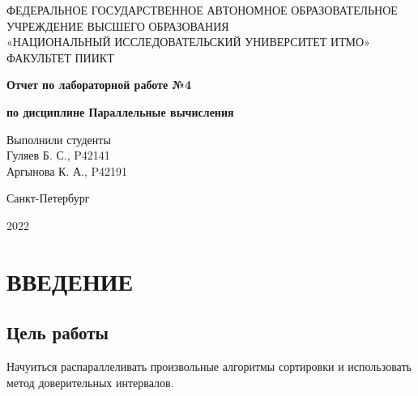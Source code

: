 \documentclass[14pt, a4paper, oneside, final]{extarticle}
\begin{document}
 
\setcounter{page}{0}
\begin{center} 
\small
\footnotesize{ФЕДЕРАЛЬНОЕ ГОСУДАРСТВЕННОЕ АВТОНОМНОЕ ОБРАЗОВАТЕЛЬНОЕ}\\
\footnotesize{УЧРЕЖДЕНИЕ ВЫСШЕГО ОБРАЗОВАНИЯ}\\ 
\footnotesize{«НАЦИОНАЛЬНЫЙ ИССЛЕДОВАТЕЛЬСКИЙ УНИВЕРСИТЕТ ИТМО»}\\
\hfill \break 
\footnotesize{ФАКУЛЬТЕТ ПИИКТ}\\
\hfill \break
\hfill \break 
\hfill \break
\large{
    \textbf{Отчет по лабораторной работе №4}

    \textbf{по дисциплине Параллельные вычисления}
}

\hfill \break 
\end{center} 
\begin{flushright} 
Выполнили студенты\\
Гуляев Б. С., P42141\\
Аргынова К. А., P42191\\
\end{flushright}
\vspace*{\fill}
\begin{center}
Санкт-Петербург

2022
\end{center}
\normalsize
\thispagestyle{empty} 
\clearpage
\def\contentsname{ОГЛАВЛЕНИЕ}
\tableofcontents 

\clearpage
\section*{ВВЕДЕНИЕ}
\subsection*{Цель работы}
Начуиться распараллеливать произвольные алгоритмы сортировки и использовать метод доверительных интервалов.
\end{document}
